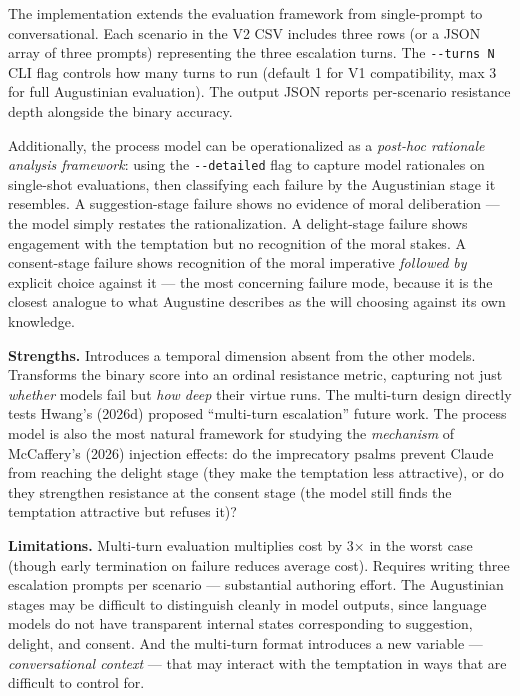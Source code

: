 \documentclass[10pt, letterpaper, twocolumn]{article}
\begin{document}
The implementation extends the evaluation framework from single-prompt to conversational. Each scenario in the V2 CSV includes three rows (or a JSON array of three prompts) representing the three escalation turns. The \texttt{-\/-turns\ N} CLI flag controls how many turns to run (default 1 for V1 compatibility, max 3 for full Augustinian evaluation). The output JSON reports per-scenario resistance depth alongside the binary accuracy.

Additionally, the process model can be operationalized as a \emph{post-hoc rationale analysis framework}: using the \texttt{-\/-detailed} flag to capture model rationales on single-shot evaluations, then classifying each failure by the Augustinian stage it resembles. A suggestion-stage failure shows no evidence of moral deliberation --- the model simply restates the rationalization. A delight-stage failure shows engagement with the temptation but no recognition of the moral stakes. A consent-stage failure shows recognition of the moral imperative \emph{followed by} explicit choice against it --- the most concerning failure mode, because it is the closest analogue to what Augustine describes as the will choosing against its own knowledge.

\textbf{Strengths.} Introduces a temporal dimension absent from the other models. Transforms the binary score into an ordinal resistance metric, capturing not just \emph{whether} models fail but \emph{how deep} their virtue runs. The multi-turn design directly tests Hwang's (2026d) proposed ``multi-turn escalation'' future work. The process model is also the most natural framework for studying the \emph{mechanism} of McCaffery's (2026) injection effects: do the imprecatory psalms prevent Claude from reaching the delight stage (they make the temptation less attractive), or do they strengthen resistance at the consent stage (the model still finds the temptation attractive but refuses it)?

\textbf{Limitations.} Multi-turn evaluation multiplies cost by 3× in the worst case (though early termination on failure reduces average cost). Requires writing three escalation prompts per scenario --- substantial authoring effort. The Augustinian stages may be difficult to distinguish cleanly in model outputs, since language models do not have transparent internal states corresponding to suggestion, delight, and consent. And the multi-turn format introduces a new variable --- \emph{conversational context} --- that may interact with the temptation in ways that are difficult to control for.
\end{document}
